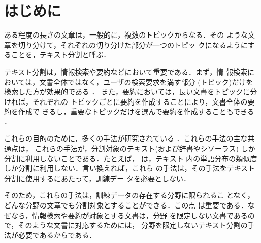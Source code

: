 


\maketitle



















\section{はじめに}
\label{sec:intro}

ある程度の長さの文章は，一般的に，複数のトピックからなる．その
ような文章を切り分けて，それぞれの切り分けた部分が一つのトピッ
クになるようにすることを，テキスト分割と呼ぶ．

テキスト分割は，情報検索や要約などにおいて重要である．まず，情
報検索においては，文書全体ではなく，ユーザの検索要求を満す部分
(トピック)だけを検索した方が効果的である
\cite{hearst93:_subtop_struc_full_lengt_docum_acces,salton96:_autom_text_decom_using_text,mochizuki2000}．
また，要約においては，長い文書をトピックに分ければ，それぞれの
トピックごとに要約を作成することにより，文書全体の要約を作成で
きるし，重要なトピックだけを選んで要約を作成することもできる
\cite{kan98:_linear_segmen_segmen_signif,nakao00:_algor_one_summar_long_text}．

これらの目的のために，多くの手法が研究されている
\cite[など]{kozima93:_text_segmen_simil_words,hearst94:_multi_parag_segmen_expos_text,okumura94:_word_sense_disam_text_segmen,salton96:_autom_text_decom_using_text,yaari97:_segmen_expos_texts_hierar_agglom_clust,kan98:_linear_segmen_segmen_signif,choi00:_advan,nakao00:_algor_one_summar_long_text,mochizuki2000}．これらの手法の主な共通点は，
これらの手法が，分割対象のテキスト(および辞書やシソーラス)
しか分割に利用しないことである．たとえば，
\cite{hearst94:_multi_parag_segmen_expos_text}は，テキスト
内の単語分布の類似度しか分割に利用しない．言い換えれば，これら
の手法は，その手法をテキスト分割に使用するにあたって，訓練デー
タを必要としない．

そのため，これらの手法は，訓練データの存在する分野に限られるこ
となく，どんな分野の文章でも分割対象とすることができる．この点
は重要である．なぜなら，情報検索や要約が対象とする文書は，分野
を限定しない文書であるので，そのような文書に対応するためには，
分野を限定しないテキスト分割の手法が必要であるからである．

